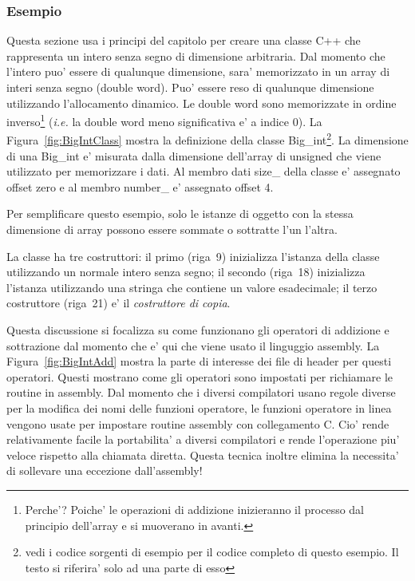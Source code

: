 \subsubsection{Esempio}
Questa sezione usa i principi del capitolo per creare una classe C++
che rappresenta un intero senza segno di dimensione arbitraria. Dal 
momento che l'intero puo' essere di qualunque dimensione, sara' 
memorizzato in un array di interi senza segno (double word). Puo' essere
reso di qualunque dimensione utilizzando l'allocamento dinamico. 
Le double word sono memorizzate in ordine inverso\footnote{Perche'?
Poiche' le operazioni di addizione  inizieranno il processo
dal principio dell'array e si muoverano in avanti.} (\emph{i.e.} la
double word meno significativa e' a indice 0). La Figura~\ref{fig:BigIntClass}
mostra la definizione della classe {\code Big\_int}\footnote{vedi
i codice sorgenti di esempio per il codice completo di questo esempio.
Il testo si riferira' solo ad una parte di esso}. La dimensione di
una {\code Big\_int} e' misurata dalla dimensione dell'array di
{\code unsigned} che viene utilizzato per memorizzare i dati. Al
membro dati {\code size\_} della classe e' assegnato offset zero e al 
membro {\code number\_} e' assegnato offset 4.

Per semplificare questo esempio, solo le istanze di oggetto con la
stessa dimensione di array possono essere sommate o sottratte l'un
l'altra.

La classe ha tre costruttori: il primo (riga~9) inizializza l'istanza
della classe utilizzando un normale intero senza segno; il secondo
(riga~18) inizializza l'istanza utilizzando una stringa che contiene
un valore esadecimale; il terzo costruttore (riga~21) e' il
\emph{costruttore di copia}. 

Questa discussione si focalizza su come funzionano gli operatori di
addizione e sottrazione dal momento che e' qui che viene usato il 
linguggio assembly. La Figura~\ref{fig:BigIntAdd} mostra la parte
di interesse dei file di header per questi operatori. Questi mostrano
come gli operatori sono impostati per richiamare le routine in 
assembly. Dal momento che i diversi compilatori usano regole diverse
per la modifica dei nomi delle funzioni operatore, le funzioni operatore
in linea vengono usate per impostare routine assembly con collegamento
C. Cio' rende relativamente facile la portabilita' a diversi compilatori
e rende l'operazione piu' veloce rispetto alla chiamata diretta. Questa
tecnica inoltre elimina la necessita' di sollevare una eccezione 
dall'assembly!

